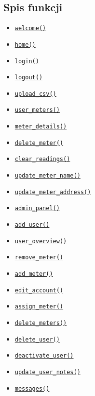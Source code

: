 \documentclass[12pt,a4paper]{report}
\begin{document}
\subsection{Spis funkcji}
\begin{itemize}
    \item \hyperref[sec:welcome]{\texttt{welcome()}}
    \item \hyperref[sec:home]{\texttt{home()}}
    \item \hyperref[sec:login]{\texttt{login()}}
    \item \hyperref[sec:logout]{\texttt{logout()}}
    \item \hyperref[sec:upload_csv]{\texttt{upload\_csv()}}
    \item \hyperref[sec:user_meters]{\texttt{user\_meters()}}
    \item \hyperref[sec:meter_details]{\texttt{meter\_details()}}
    \item \hyperref[sec:delete_meter]{\texttt{delete\_meter()}}
    \item \hyperref[sec:clear_readings]{\texttt{clear\_readings()}}
    \item \hyperref[sec:update_meter_name]{\texttt{update\_meter\_name()}}
    \item \hyperref[sec:update_meter_address]{\texttt{update\_meter\_address()}}
    \item \hyperref[sec:admin_panel]{\texttt{admin\_panel()}}
    \item \hyperref[sec:add_user]{\texttt{add\_user()}}
    \item \hyperref[sec:user_overview]{\texttt{user\_overview()}}
    \item \hyperref[sec:remove_meter]{\texttt{remove\_meter()}}
    \item \hyperref[sec:add_meter]{\texttt{add\_meter()}}
    \item \hyperref[sec:edit_account]{\texttt{edit\_account()}}
    \item \hyperref[sec:assign_meter]{\texttt{assign\_meter()}}
    \item \hyperref[sec:delete_meters]{\texttt{delete\_meters()}}
    \item \hyperref[sec:delete_user]{\texttt{delete\_user()}}
    \item \hyperref[sec:deactivate_user]{\texttt{deactivate\_user()}}
    \item \hyperref[sec:update_user_notes]{\texttt{update\_user\_notes()}}
    \item \hyperref[sec:messages]{\texttt{messages()}}

\end{itemize}
\end{document}
